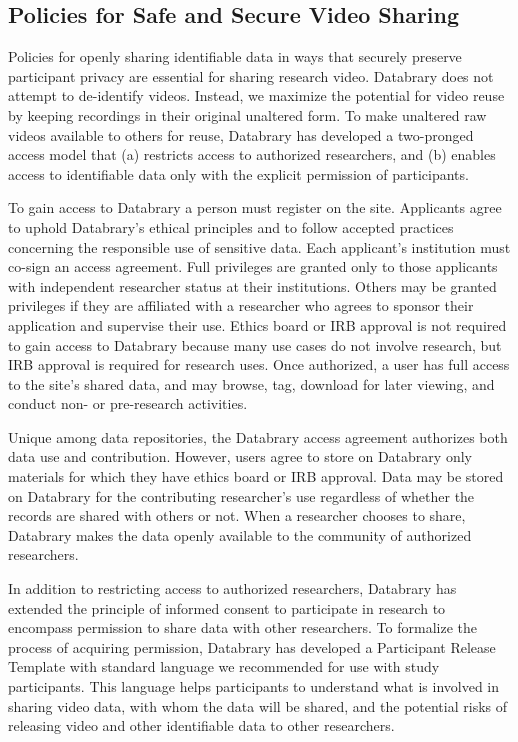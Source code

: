 \documentclass[letterpaper,man,apacite]{apa6}
\begin{document}
\subsection{Policies for Safe and Secure Video Sharing}
Policies for openly sharing identifiable data in ways that securely preserve participant privacy are essential for sharing research video. 
Databrary does not attempt to de-identify videos. 
Instead, we maximize the potential for video reuse by keeping recordings in their original unaltered form. 
To make unaltered raw videos available to others for reuse, Databrary has developed a two-pronged access model that (a) restricts access to authorized researchers, and (b) enables access to identifiable data only with the explicit permission of participants.

To gain access to Databrary a person must register on the site.
Applicants agree to uphold Databrary's ethical principles and to follow accepted practices concerning the responsible use of sensitive data.
Each applicant's institution must co-sign an access agreement. 
Full privileges are granted only to those applicants with independent researcher status at their institutions. 
Others may be granted privileges if they are affiliated with a researcher who agrees to sponsor their application and supervise their use. 
Ethics board or IRB approval is not required to gain access to Databrary because many use cases do not involve research, but IRB approval is required for research uses. 
Once authorized, a user has full access to the site’s shared data, and may browse, tag, download for later viewing, and conduct non- or pre-research activities.

Unique among data repositories, the Databrary access agreement authorizes both data use and contribution. 
However, users agree to store on Databrary only materials for which they have ethics board or IRB approval. 
Data may be stored on Databrary for the contributing researcher’s use regardless of whether the records are shared with others or not. 
When a researcher chooses to share, Databrary makes the data openly available to the community of authorized researchers. 

In addition to restricting access to authorized researchers, Databrary has extended the principle of informed consent to participate in research to encompass permission to share data with other researchers.
To formalize the process of acquiring permission, Databrary has developed a Participant Release Template \cite{Databrary2015} with standard language we recommended for use with study participants. 
This language helps participants to understand what is involved in sharing video data, with whom the data will be shared, and the potential risks of releasing video and other identifiable data to other researchers. 
\end{document}
